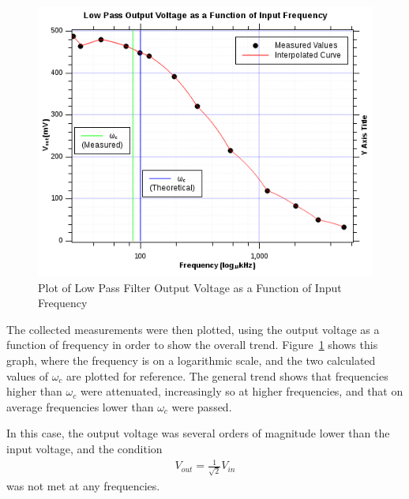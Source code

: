 \documentclass[twocolumn,english]{IEEEtran}
\theoremstyle{plain}
\theoremstyle{plain}
\begin{document}
		\begin{figure}[H]
			\begin{centering}
			\begin{center}
			\includegraphics[width=.8\linewidth]{./Graphs/LowPass.png}
			\caption{Plot of Low Pass Filter Output Voltage as a Function of Input Frequency}
			\label{graph:lp_output}
			\end{center}
			\par\end{centering}
		\end{figure}

		The collected measurements were then plotted, using the output voltage as a function of frequency in order to show the overall trend. Figure~\ref{graph:lp_output} shows this graph, where the frequency is on a logarithmic scale, and the two calculated values of $\omega_c$ are plotted for reference. The general trend shows that frequencies higher than $\omega_c$ were attenuated, increasingly so at higher frequencies, and that on average frequencies lower than $\omega_c$ were passed.

		In this case, the output voltage was several orders of magnitude lower than the input voltage, and the condition
		\begin{align*}
			V_{out} = \frac{1}{\sqrt{2}}V_{in}
		\end{align*}
		was not met at any frequencies.

\clearpage
\end{document}
